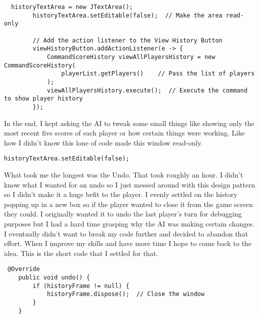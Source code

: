 \documentclass[a4paper,11pt]{article}
\begin{document}
\begin{lstlisting}
  historyTextArea = new JTextArea();
        historyTextArea.setEditable(false);  // Make the area read-only

        // Add the action listener to the View History Button
        viewHistoryButton.addActionListener(e -> {
            CommandScoreHistory viewAllPlayersHistory = new CommandScoreHistory(
                playerList.getPlayers()    // Pass the list of players      
            );
            viewAllPlayersHistory.execute();  // Execute the command to show player history
        });
 \end{lstlisting}
In the end, I kept asking the AI to tweak some small things like showing only the most recent five scores of each player or how certain things were working. Like how I didn't know this lone of code made this window read-only. 
\begin{lstlisting}
historyTextArea.setEditable(false);
 \end{lstlisting}
What took me the longest was the Undo. That took roughly an hour. I didn't know what I wanted for an undo so I just messed around with this design pattern so I didn't make it a huge befit to the player. I evenly settled on the history popping up in a new box so if the player wanted to close it from the game screen they could. I originally wanted it to undo the last player's turn for debugging purposes but I had a hard time grasping why the AI was making certain changes. I eventually didn't want to break my code further and decided to abandon that effort. When I improve my skills and have more time I hope to come back to the idea. 
This is the short code that I settled for that. 
 \begin{lstlisting}
 @Override
    public void undo() { 
        if (historyFrame != null) {
            historyFrame.dispose();  // Close the window
        }
    }
 \end{lstlisting}
 
\end{document}
